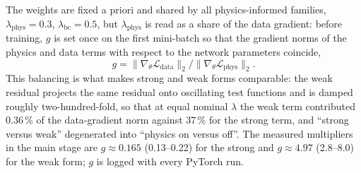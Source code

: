 The weights are fixed a priori and shared by all physics-informed families,
$\lambda_{\mathrm{phys}}=0.3$, $\lambda_{\mathrm{bc}}=0.5$,
but $\lambda_{\mathrm{phys}}$ is read as a share of the data gradient: before
training, $g$ is set once on the first mini-batch so that the gradient norms of
the physics and data terms with respect to the network parameters coincide,
\begin{equation}
  g = \lVert\nabla_{\theta}\mathcal{L}_{\mathrm{data}}\rVert_2 \big/
      \lVert\nabla_{\theta}\mathcal{L}_{\mathrm{phys}}\rVert_2 .
  \label{eq:calib}
\end{equation}
This balancing \cite{TODO-pinn-gradient-balancing} is what makes strong and weak
forms comparable: the weak residual projects the same residual onto oscillating
test functions and is damped roughly two-hundred-fold, so that at equal nominal
$\lambda$ the weak term contributed 0.36\,\% of the data-gradient norm against
37\,\% for the strong term, and ``strong versus weak'' degenerated into ``physics
on versus off''.
The measured multipliers in the main stage are $g\approx0.165$ (0.13--0.22) for
the strong and $g\approx4.97$ (2.8--8.0) for the weak form; $g$ is logged with
every PyTorch run.

